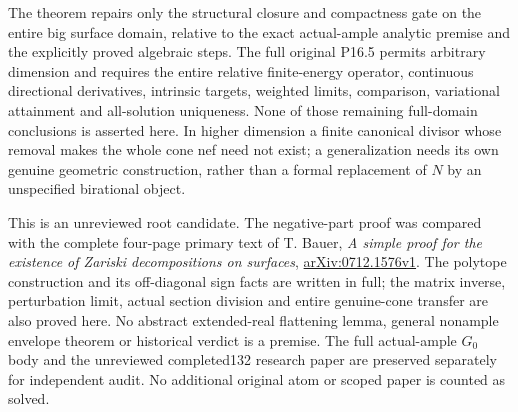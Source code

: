 \documentclass[11pt]{article}
\begin{document}
The theorem repairs only the structural closure and compactness
gate on the entire big surface domain, relative to the exact
actual-ample analytic premise and the explicitly proved algebraic
steps. The full original P16.5 permits arbitrary dimension and
requires the entire relative finite-energy operator, continuous
directional derivatives, intrinsic targets, weighted limits,
comparison, variational attainment and all-solution uniqueness.
None of those remaining full-domain conclusions is asserted here.
In higher dimension a finite canonical divisor whose removal makes
the whole cone nef need not exist; a generalization needs its own
genuine geometric construction, rather than a formal replacement
of $N$ by an unspecified birational object.

This is an unreviewed root candidate. The negative-part proof was
compared with the complete four-page primary text of T. Bauer,
\emph{A simple proof for the existence of Zariski decompositions
on surfaces},
\href{https://arxiv.org/pdf/0712.1576v1}{arXiv:0712.1576v1}.
The polytope construction and its off-diagonal sign facts are
written in full; the matrix inverse, perturbation limit,
actual section division and entire genuine-cone transfer are
also proved here. No abstract extended-real flattening lemma,
general nonample envelope theorem or historical verdict is a premise.
The full actual-ample $G_0$ body and the unreviewed completed132
research paper are preserved separately for independent audit.
No additional original atom or scoped paper is counted as solved.
\end{document}
